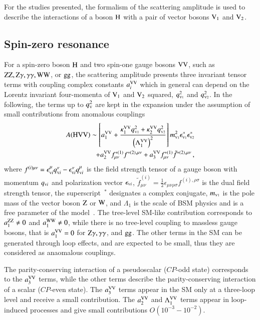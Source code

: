 For the studies presented, the formalism of the scattering amplitude is used
to describe the interactions of a boson $\mathrm{H}$ with a pair of vector bosons $\mathrm{V}_1$ and $\mathrm{V}_2$.

\subsection{Spin-zero resonance}
For a spin-zero boson $\mathrm{H}$ and two spin-one gauge bosons $\mathrm{V}\mathrm{V}$, such
as $\mathrm{Z}\mathrm{Z}, \mathrm{Z} \gamma, \gamma\gamma, \mathrm{W}\mathrm{W}$, or $\mathrm{g}\mathrm{g}$, the scattering amplitude
presents three invariant tensor terms with coupling complex constants $a_{i}^{\mathrm{V}\mathrm{V}}$
which in general can depend on the Lorentz invariant four-momenta
of $\mathrm{V}_1$ and $\mathrm{V}_2$ squared, $q_{\scriptscriptstyle\mathrm{V}1}^2$ and $q_{\scriptscriptstyle\mathrm{V}2}^2$. 
In the following, the terms up to $q_{\scriptscriptstyle\mathrm{V}}^2$  are kept in the expansion under the assumption 
of small contributions from anomalous couplings
%
\begin{eqnarray}
A(\mathrm{H}\mathrm{V}\mathrm{V}) \sim 
\left[ a_{1}^{\mathrm{V}\mathrm{V}} 
+ \frac{\kappa_1^{\mathrm{V}\mathrm{V}}q_{\scriptscriptstyle\mathrm{V}1}^2 + \kappa_2^{\mathrm{V}\mathrm{V}} q_{\scriptscriptstyle\mathrm{V}2}^{2}}{\left(\Lambda_{1}^{\mathrm{V}\mathrm{V}} \right)^{2}} \right] 
m_{\scriptscriptstyle\mathrm{V}1}^2 \epsilon_{\scriptscriptstyle\mathrm{V}1}^* \epsilon_{\scriptscriptstyle\mathrm{V}2}^* \\ \nonumber
+ a_{2}^{\mathrm{V}\mathrm{V}}  f_{\mu \nu}^{*(1)}f^{*(2),\mu\nu} 
+ a_{3}^{\mathrm{V}\mathrm{V}}   f^{*(1)}_{\mu \nu} {\tilde f}^{*(2),\mu\nu}\,,
\label{eq:formfact-fullampl-spin0} 
\end{eqnarray}
%
where $f^{(i){\mu \nu}} =
\epsilon_{{\scriptscriptstyle\mathrm{V}}i}^{\mu}q_{{\scriptscriptstyle\mathrm{V}}i}^{\nu} -
\epsilon_{{\scriptscriptstyle\mathrm{V}}i}^\nu q_{{\scriptscriptstyle\mathrm{V}}i}^{\mu} $ is the field strength
tensor of a gauge boson with momentum $q_{{\scriptscriptstyle\mathrm{V}}i}$ and polarization
vector $\epsilon_{{\scriptscriptstyle\mathrm{V}}i}$, ${\tilde f}^{(i)}_{\mu \nu} =
\frac{1}{2} \epsilon_{\mu\nu\rho\sigma} f^{(i),\rho\sigma}$ is the
dual field strength tensor, the superscript~$^*$ designates a complex
conjugate, $m_{\scriptscriptstyle\mathrm{V}1}$ is the pole mass of the vector boson $\mathrm{Z}$ or
$\mathrm{W}$, and $\Lambda_{1}$ is the scale of BSM physics and is a free
parameter of the model~\cite{Anderson:2013afp}. The tree-level SM-like
contribution corresponds to $a_{1}^{\mathrm{Z}\mathrm{Z}}\ne 0$ and $a_{1}^{\mathrm{W}\mathrm{W}}
\ne 0$, while there is no tree-level coupling to massless gauge
bosons, that is $a_{1}^{\mathrm{V}\mathrm{V}}= 0$ for $\mathrm{Z} \gamma, \gamma\gamma$, and
$\mathrm{g}\mathrm{g}$. The other terms in the SM can be generated through loop
effects, and are expected to be small, thus they are considered as
anaomalous couplings.

The parity-conserving interaction of a pseudoscalar ($CP$-odd state)
corresponds to the $a_{3}^{\mathrm{V}\mathrm{V}}$ terms, while the other terms
describe the parity-conserving interaction of a scalar ($CP$-even
state).  The $a_{3}^{\mathrm{V}\mathrm{V}}$ terms appear in the SM only at a
three-loop level and receive a small contribution.  The $a_{2}^{\mathrm{V}\mathrm{V}}$
and $\Lambda_{1}^{\mathrm{V}\mathrm{V}}$ terms appear in loop-induced processes and
give small contributions $O(10^{-3} - 10^{-2})$.

